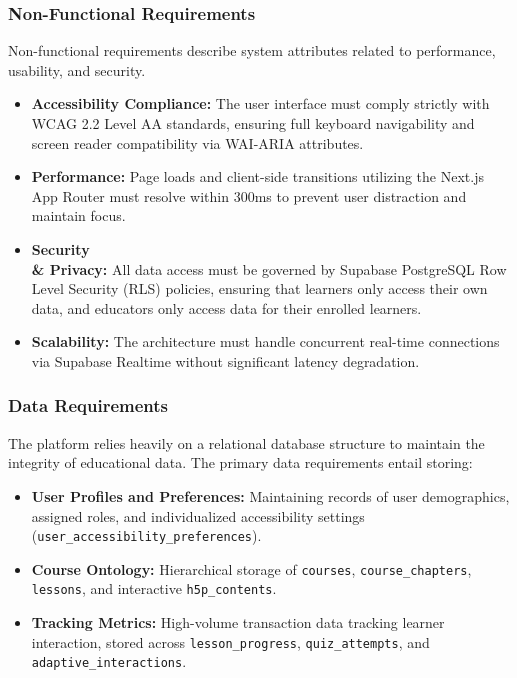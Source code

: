\documentclass[12pt,a4paper]{report}
\begin{document}
\subsubsection{Non-Functional Requirements}
Non-functional requirements describe system attributes related to performance, usability, and security.
\begin{itemize}[itemsep=-1mm]
\item \textbf{Accessibility Compliance:} The user interface must comply strictly with WCAG 2.2 Level AA standards, ensuring full keyboard navigability and screen reader compatibility via WAI-ARIA attributes.
\item \textbf{Performance:} Page loads and client-side transitions utilizing the Next.js App Router must resolve within 300ms to prevent user distraction and maintain focus.
\item \textbf{Security \\\& Privacy:} All data access must be governed by Supabase PostgreSQL Row Level Security (RLS) policies, ensuring that learners only access their own data, and educators only access data for their enrolled learners.
\item \textbf{Scalability:} The architecture must handle concurrent real-time connections via Supabase Realtime without significant latency degradation.
\end{itemize}

\subsubsection{Data Requirements}
The platform relies heavily on a relational database structure to maintain the integrity of educational data. The primary data requirements entail storing:
\begin{itemize}[itemsep=-1mm]
\item \textbf{User Profiles and Preferences:} Maintaining records of user demographics, assigned roles, and individualized accessibility settings (\texttt{user\_accessibility\_preferences}).
\item \textbf{Course Ontology:} Hierarchical storage of \texttt{courses}, \texttt{course\_chapters}, \texttt{lessons}, and interactive \texttt{h5p\_contents}.
\item \textbf{Tracking Metrics:} High-volume transaction data tracking learner interaction, stored across \texttt{lesson\_progress}, \texttt{quiz\_attempts}, and \texttt{adaptive\_interactions}.
\end{itemize}
\end{document}
